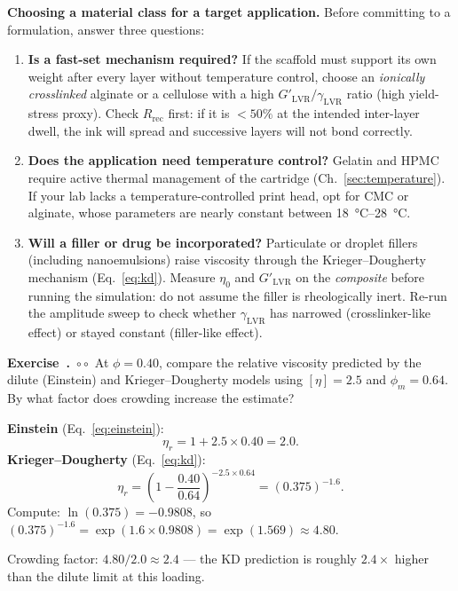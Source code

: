 \documentclass[11pt,a4paper]{article}
\newcommand{\diffB}{\textcolor{orange!80!black}{$\circ\circ$}}
\newcounter{exidx}[section]
\renewcommand{\theexidx}{\thesection.\arabic{exidx}}
\newenvironment{exercise}[1]%
  {\par\smallskip\refstepcounter{exidx}%
   \noindent\textbf{Exercise~\theexidx}~#1\quad}
  {\par\smallskip}
\begin{document}
\begin{inpracticebox}
\textbf{Choosing a material class for a target application.}
Before committing to a formulation, answer three questions:

\begin{enumerate}[leftmargin=1.6em,itemsep=3pt]
\item \textbf{Is a fast-set mechanism required?}
  If the scaffold must support its own weight after every layer without
  temperature control, choose an \emph{ionically crosslinked} alginate
  or a cellulose with a high $G'_\mathrm{LVR}/\gamma_\mathrm{LVR}$
  ratio (high yield-stress proxy).  Check $R_\mathrm{rec}$ first: if it
  is $<50\%$ at the intended inter-layer dwell, the ink will spread and
  successive layers will not bond correctly.

\item \textbf{Does the application need temperature control?}
  Gelatin and HPMC require active thermal management of the cartridge
  (Ch.~\ref{sec:temperature}).  If your lab lacks a temperature-controlled
  print head, opt for CMC or alginate, whose parameters are nearly
  constant between \SIrange{18}{28}{\celsius}.

\item \textbf{Will a filler or drug be incorporated?}
  Particulate or droplet fillers (including nanoemulsions) raise
  viscosity through the Krieger--Dougherty mechanism
  (Eq.~\ref{eq:kd}).  Measure $\eta_0$ and $G'_\mathrm{LVR}$ on the
  \emph{composite} before running the simulation: do not assume the
  filler is rheologically inert.  Re-run the amplitude sweep to check
  whether $\gamma_\mathrm{LVR}$ has narrowed (crosslinker-like effect)
  or stayed constant (filler-like effect).
\end{enumerate}
\end{inpracticebox}

\begin{exercise}{\diffB}
At $\phi=0.40$, compare the relative viscosity predicted by the dilute
(Einstein) and Krieger--Dougherty models using $[\eta]=2.5$ and
$\phi_m=0.64$.  By what factor does crowding increase the estimate?
\begin{solution}
\textbf{Einstein} (Eq.~\ref{eq:einstein}):
\[
\eta_r = 1 + 2.5\times 0.40 = 2.0.
\]
\textbf{Krieger--Dougherty} (Eq.~\ref{eq:kd}):
\[
\eta_r
= \left(1 - \frac{0.40}{0.64}\right)^{-2.5\times 0.64}
= (0.375)^{-1.6}.
\]
Compute: $\ln(0.375)=-0.9808$, so
$(0.375)^{-1.6}=\exp(1.6\times 0.9808)=\exp(1.569)\approx\mathbf{4.80}$.

Crowding factor: $4.80/2.0\approx\mathbf{2.4}$ --- the KD prediction is
roughly $2.4\times$ higher than the dilute limit at this loading.
\end{solution}
\end{exercise}
\end{document}
